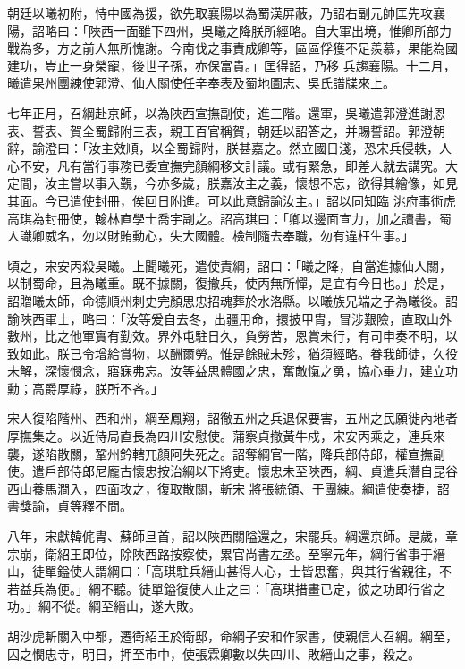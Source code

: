 \begin{pinyinscope}
 朝廷以曦初附，恃中國為援，欲先取襄陽以為蜀漢屏蔽，乃詔右副元帥匡先攻襄陽，詔略曰：「陜西一面雖下四州，吳曦之降朕所經略。自大軍出境，惟卿所部力戰為多，方之前人無所愧謝。今南伐之事責成卿等，區區俘獲不足羨慕，果能為國建功，豈止一身榮寵，後世子孫，亦保富貴。」匡得詔，乃移
 兵趨襄陽。十二月，曦遣果州團練使郭澄、仙人關使任辛奉表及蜀地圖志、吳氏譜牒來上。



 七年正月，召綱赴京師，以為陜西宣撫副使，進三階。還軍，吳曦遣郭澄進謝恩表、誓表、賀全蜀歸附三表，親王百官稱賀，朝廷以詔答之，并賜誓詔。郭澄朝辭，諭澄曰：「汝主效順，以全蜀歸附，朕甚嘉之。然立國日淺，恐宋兵侵軼，人心不安，凡有當行事務已委宣撫完顏綱移文計議。或有緊急，即差人就去講究。大定間，汝主嘗以事入覲，今亦多歲，朕嘉汝主之義，懷想不忘，欲得其繪像，如見其面。今已遣使封冊，俟回日附進。可以此意歸諭汝主。」詔以同知臨
 洮府事術虎高琪為封冊使，翰林直學士喬宇副之。詔高琪曰：「卿以邊面宣力，加之讀書，蜀人識卿威名，勿以財賄動心，失大國體。檢制隨去奉職，勿有違枉生事。」



 頃之，宋安丙殺吳曦。上聞曦死，遣使責綱，詔曰：「曦之降，自當進據仙人關，以制蜀命，且為曦重。既不據關，復撤兵，使丙無所憚，是宜有今日也。」於是，詔贈曦太師，命德順州刺史完顏思忠招魂葬於水洛縣。以曦族兄端之子為曦後。詔諭陜西軍士，略曰：「汝等爰自去冬，出疆用命，擐披甲胄，冒涉艱險，直取山外數州，比之他軍實有勤效。界外屯駐日久，負勞苦，恩賞未行，有司申奏不明，以
 致如此。朕已令增給賞物，以酬爾勞。惟是餘賊未殄，猶須經略。眷我師徒，久役未解，深懷憫念，寤寐弗忘。汝等益思體國之忠，奮敵愾之勇，協心畢力，建立功勳；高爵厚祿，朕所不吝。」



 宋人復陷階州、西和州，綱至鳳翔，詔徹五州之兵退保要害，五州之民願徙內地者厚撫集之。以近侍局直長為四川安慰使。蒲察貞撤黃牛戍，宋安丙乘之，連兵來襲，遂陷散關，鞏州鈐轄兀顏阿失死之。詔奪綱官一階，降兵部侍郎，權宣撫副使。遣戶部侍郎尼龐古懷忠按治綱以下將吏。懷忠未至陜西，綱、貞遣兵潛自昆谷西山養馬澗入，四面攻之，復取散關，斬宋
 將張統領、于團練。綱遣使奏捷，詔書獎諭，貞等釋不問。



 八年，宋獻韓侂胄、蘇師旦首，詔以陜西關隘還之，宋罷兵。綱還京師。是歲，章宗崩，衛紹王即位，除陜西路按察使，累官尚書左丞。至寧元年，綱行省事于縉山，徒單鎰使人謂綱曰：「高琪駐兵縉山甚得人心，士皆思奮，與其行省親往，不若益兵為便。」綱不聽。徒單鎰復使人止之曰：「高琪措畫已定，彼之功即行省之功。」綱不從。綱至縉山，遂大敗。



 胡沙虎斬關入中都，遷衛紹王於衛邸，命綱子安和作家書，使親信人召綱。綱至，囚之憫忠寺，明日，押至市中，使張霖卿數以失四川、敗縉山之事，殺之。




\end{pinyinscope}
